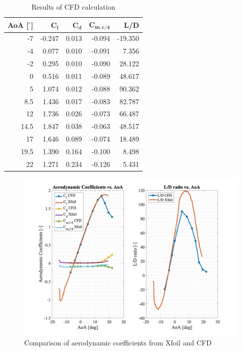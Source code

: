 \begin{table}[]
\centering
\caption{Results of CFD calculation}
\begin{tabular}{|r|r|r|r|r|}
\hline
\textbf{AoA} [$^\circ$]  & $\boldsymbol{C_l}$  & $\boldsymbol{C_d}$ & $\boldsymbol{C_{m,c/4}}$  & \textbf{L/D}   \\ \hline \hline
-7   & -0.247 & 0.013 & -0.094 & -19.350 \\ \hline
-4   & 0.077  & 0.010 & -0.091 & 7.356   \\ \hline
-2   & 0.295  & 0.010 & -0.090 & 28.122  \\ \hline
0    & 0.516  & 0.011 & -0.089 & 48.617  \\ \hline
5    & 1.074  & 0.012 & -0.088 & 90.362  \\ \hline
8.5  & 1.436  & 0.017 & -0.083 & 82.787  \\ \hline
12   & 1.736  & 0.026 & -0.073 & 66.487  \\ \hline
14.5 & 1.847  & 0.038 & -0.063 & 48.517  \\ \hline
17   & 1.646  & 0.089 & -0.074 & 18.489  \\ \hline
19.5 & 1.390  & 0.164 & -0.100 & 8.498   \\ \hline
22   & 1.271  & 0.234 & -0.126 & 5.431   \\ \hline
\end{tabular}
\end{table}

\begin{figure}[H]
	\centering
	\includegraphics[width=\textwidth]{coeffs.jpg}
	\caption{Comparison of aerodynamic coefficients from Xfoil and CFD}
\label{fig:coeffs}
\end{figure}

